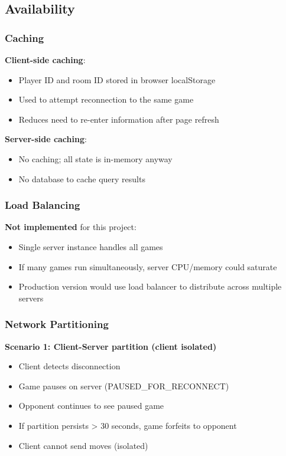 \documentclass{scrartcl}
\begin{document}
\subsection{Availability}\label{availability}

\subsubsection{Caching}

\textbf{Client-side caching}:

\begin{itemize}
  \item Player ID and room ID stored in browser localStorage
  \item Used to attempt reconnection to the same game
  \item Reduces need to re-enter information after page refresh
\end{itemize}

\textbf{Server-side caching}:

\begin{itemize}
  \item No caching; all state is in-memory anyway
  \item No database to cache query results
\end{itemize}

\subsubsection{Load Balancing}

\textbf{Not implemented} for this project:

\begin{itemize}
  \item Single server instance handles all games
  \item If many games run simultaneously, server CPU/memory could saturate
  \item Production version would use load balancer to distribute across multiple servers
\end{itemize}

\subsubsection{Network Partitioning}

\textbf{Scenario 1: Client-Server partition (client isolated)}

\begin{itemize}
  \item Client detects disconnection
  \item Game pauses on server (PAUSED\_FOR\_RECONNECT)
  \item Opponent continues to see paused game
  \item If partition persists > 30 seconds, game forfeits to opponent
  \item Client cannot send moves (isolated)
\end{itemize}
\end{document}
